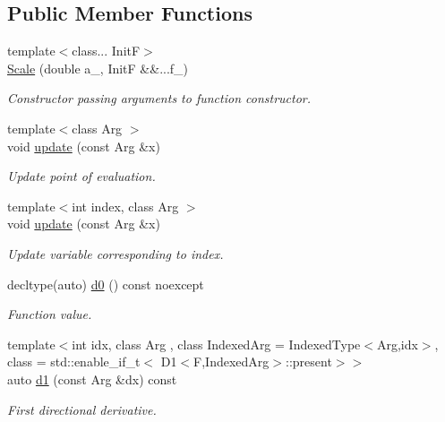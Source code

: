 \subsection*{Public Member Functions}
\begin{DoxyCompactItemize}
\item 
{\footnotesize template$<$class... InitF$>$ }\\\hyperlink{structFunG_1_1MathematicalOperations_1_1Scale_a10c61b696b4777db7d5c53b4a96b210a}{Scale} (double a\+\_\+, InitF \&\&...f\+\_\+)
\begin{DoxyCompactList}\small\item\em Constructor passing arguments to function constructor. \end{DoxyCompactList}\item 
{\footnotesize template$<$class Arg $>$ }\\void \hyperlink{structFunG_1_1MathematicalOperations_1_1Scale_a78bbb512333a17c72928d3f21de63dee}{update} (const Arg \&x)
\begin{DoxyCompactList}\small\item\em Update point of evaluation. \end{DoxyCompactList}\item 
{\footnotesize template$<$int index, class Arg $>$ }\\void \hyperlink{structFunG_1_1MathematicalOperations_1_1Scale_a49b277539bf6582956f68d325ce4a44d}{update} (const Arg \&x)
\begin{DoxyCompactList}\small\item\em Update variable corresponding to index. \end{DoxyCompactList}\item 
decltype(auto) \hyperlink{structFunG_1_1MathematicalOperations_1_1Scale_aec01731655fabb0f6fcfd06493aec4af}{d0} () const noexcept
\begin{DoxyCompactList}\small\item\em Function value. \end{DoxyCompactList}\item 
{\footnotesize template$<$int idx, class Arg , class Indexed\+Arg  = Indexed\+Type$<$\+Arg,idx$>$, class  = std\+::enable\+\_\+if\+\_\+t$<$ D1$<$\+F,\+Indexed\+Arg$>$\+::present$>$$>$ }\\auto \hyperlink{structFunG_1_1MathematicalOperations_1_1Scale_aa917dfae80d3682fdbbe1e1c8214c503}{d1} (const Arg \&dx) const 
\begin{DoxyCompactList}\small\item\em First directional derivative. \end{DoxyCompactList}\item 

\end{DoxyCompactItemize}
